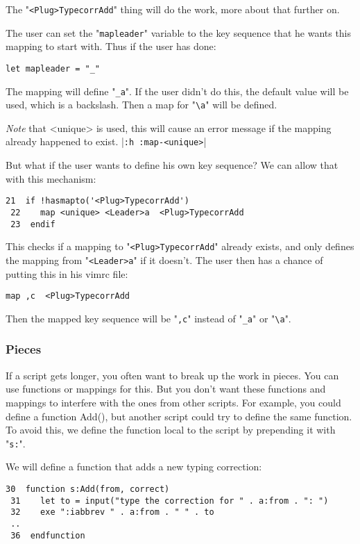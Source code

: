 The "\verb!<Plug>TypecorrAdd!" thing will do the work, more about that further on.

The user can set the "\verb!mapleader!" variable to the key sequence that he wants this mapping to start with.
Thus if the user has done:

\begin{Verbatim}[samepage=true]
 let mapleader = "_"
\end{Verbatim}

The mapping will define "\verb!_a!".
If the user didn't do this, the default value will be used, which is a backslash.
Then a map for "\verb!\a!" will be defined.

\emph{Note} that <unique> is used, this will cause an error message if the mapping already happened to exist. |\verb!:h :map-<unique>!|

But what if the user wants to define his own key sequence?
We can allow that with this mechanism:

\begin{Verbatim}[samepage=true]
 21  if !hasmapto('<Plug>TypecorrAdd')
 22    map <unique> <Leader>a  <Plug>TypecorrAdd
 23  endif
\end{Verbatim}

This checks if a mapping to "\verb!<Plug>TypecorrAdd!" already exists, and only defines the mapping from "\verb!<Leader>a!" if it doesn't.
The user then has a chance of putting this in his vimrc file:

\begin{Verbatim}[samepage=true]
 map ,c  <Plug>TypecorrAdd
\end{Verbatim}

Then the mapped key sequence will be "\verb!,c!" instead of "\verb!_a!" or "\verb!\a!".
\subsubsection{Pieces}
If a script gets longer, you often want to break up the work in pieces.
You can use functions or mappings for this.
But you don't want these functions and mappings to interfere with the ones from other scripts.
For example, you could define a function Add(), but another script could try to define the same function.
To avoid this, we define the function local to the script by prepending it with "\verb!s:!".

We will define a function that adds a new typing correction:

\begin{Verbatim}[samepage=true]
 30  function s:Add(from, correct)
 31    let to = input("type the correction for " . a:from . ": ")
 32    exe ":iabbrev " . a:from . " " . to
 ..
 36  endfunction
\end{Verbatim}

